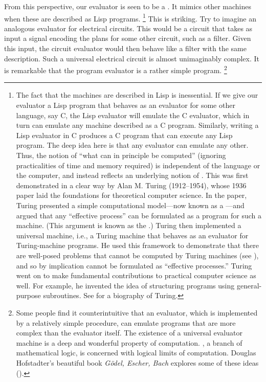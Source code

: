 From this perspective, our evaluator is seen to be a .
It mimics other machines when these are described as Lisp programs.%
\footnote{
	The fact that the machines are described in Lisp is inessential.
	If we give our evaluator a Lisp program that behaves as an evaluator for some other language, say C, the Lisp evaluator will emulate the C evaluator, which in turn can emulate any machine described as a C program.
	Similarly, writing a Lisp evaluator in C produces a C program that can execute any Lisp program.
	The deep idea here is that any evaluator can emulate any other.
	Thus, the notion of “what can in principle be computed” (ignoring practicalities of time and memory required) is independent of the language or the computer, and instead reflects an underlying notion of .
	This was first demonstrated in a clear way by Alan M.
	Turing (1912--1954), whose 1936 paper laid the foundations for theoretical computer science.
	In the paper, Turing presented a simple computational model---now known as a ---and argued that any “effective process” can be formulated as a program for such a machine.
	(This argument is known as the .)
	Turing then implemented a universal machine, i.e., a Turing machine that behaves as an evaluator for Turing-machine programs.
	He used this framework to demonstrate that there are well-posed problems that cannot be computed by Turing machines (see ), and so by implication cannot be formulated as “effective processes.”
	Turing went on to make fundamental contributions to practical computer science as well.
	For example, he invented the idea of structuring programs using general-purpose subroutines.
	See  for a biography of Turing.
}
This is striking.
Try to imagine an analogous evaluator for electrical circuits.
This would be a circuit that takes as input a signal encoding the plans for some other circuit, such as a filter.
Given this input, the circuit evaluator would then behave like a filter with the same description.
Such a universal electrical circuit is almost unimaginably complex.
It is remarkable that the program evaluator is a rather simple program.%
\footnote{
	Some people find it counterintuitive that an evaluator, which is implemented by a relatively simple procedure, can emulate programs that are more complex than the evaluator itself.
	The existence of a universal evaluator machine is a deep and wonderful property of computation.
	, a branch of mathematical logic, is concerned with logical limits of computation.
	Douglas Hofstadter’s beautiful book \textit{Gödel, Escher, Bach} explores some of these ideas ().
}

